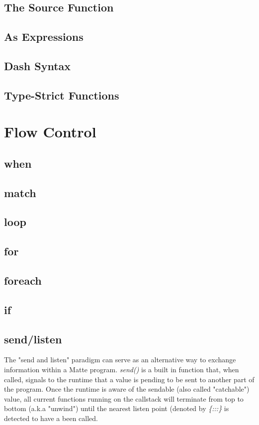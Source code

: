 \documentclass[12pt,letterpaper]{report}
\begin{document}
\section{The Source Function}\label{The Source Function}
\section{As Expressions}\label{As Expressions}
\section{Dash Syntax}\label{Dash Syntax}
\section{Type-Strict Functions}\label{Type-Strict Functions}
\chapter{Flow Control}\label{Flow Control}
\section{when}\label{when}
\section{match}\label{match}
\section{loop}\label{loop}
\section{for}\label{for}
\section{foreach}\label{foreach}
\section{if}\label{if}
\section{send/listen}\label{send/listen}

The "send and listen" paradigm can serve as an alternative way to exchange information within 
a Matte program. \textit{send()} is a built in function that, when called, signals to the runtime
that a value is pending to be sent to another part of the program. Once the runtime is aware of 
the sendable (also called "catchable") value, all current functions running on the callstack 
will terminate from top to bottom (a.k.a "unwind") until the nearest listen point
(denoted by \textit{\{:::\}} is detected to have a been called.
\end{document}
